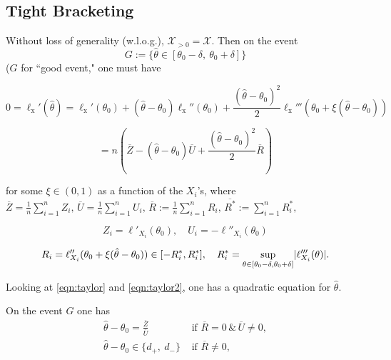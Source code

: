 \medskip

\subsection*{Tight Bracketing}

Without loss of generality (w.l.o.g.), $\mathcal{X}_{>0}=\mathcal{X}$. Then on the event
\begin{equation}\label{eqn:goodevent}
	G:=\{\hat{\theta}\in[\theta_{0}-\delta,\ \theta_{0}+\delta]\}
\end{equation}
($G$ for ``good event," one must have

\begin{equation}\label{eqn:taylor}
	0 =\ell_{\mathrm{x}}'(\displaystyle \hat{\theta})=\ell_{\mathrm{x}}'(\theta_{0})+(\hat{\theta}-\theta_{0})\ell_{\mathrm{x}}''(\theta_{0})+\frac{(\hat{\theta}-\theta_{0})^{2}}{2}\ell_{\mathrm{x}}'''(\theta_{0}+\xi(\hat{\theta}-\theta_{0}))
\end{equation}

\begin{equation}\label{eqn:taylor2}
	=n(\overline{Z}-(\hat{\theta}-\theta_{0})\overline{U}+\frac{(\hat{\theta}-\theta_{0})^{2}}{2}\overline{R})
\end{equation}

for some $\xi\in (0,1)$ as a function of the $X_i$'s, where $\overline{Z}=\frac{1}{n}\sum_{i=1}^n Z_i,\, \overline{U}=\frac{1}{n}\sum_{i=1}^{n}U_{i},\, \overline{R}:=\frac{1}{n}\sum_{i=1}^{n}R_{i},\,
\overline{R^{*}}:=\sum_{i=1}^{n}R_{i}^{*},$

\begin{equation}\label{eqn:Z}
	Z_i = \ell'_{X_i}(\theta_0),\quad U_i=-\ell''_{X_i}(\theta_0)
\end{equation}

\begin{equation}\label{eqn:R}
	R_i = \ell''_{X_i}(\theta_0 + \xi(\hat{\theta}-\theta_0))\in [-R_i^{*},R_i^{*}], \quad R_i^{*}=\sup_{\theta\in [\theta_0-\delta,\theta_0+\delta]} \lvert\ell'''_{X_i}(\theta)\rvert.
\end{equation}

Looking at \eqref{eqn:taylor} and \eqref{eqn:taylor2}, one has a quadratic equation for $\hat{\theta}$.

On the event $G$ one has
\begin{align*}
	\hat{\theta}-\theta_{0}=\frac{\overline{Z}}{\overline{U}} &\textrm{ if } \overline{R}=0\, \&\, \overline{U}\neq 0, \\
	\hat{\theta}-\theta_{0}\in\{d_{+},\ d_{-}\} &\textrm{ if } \overline{R}\neq 0,
\end{align*}

